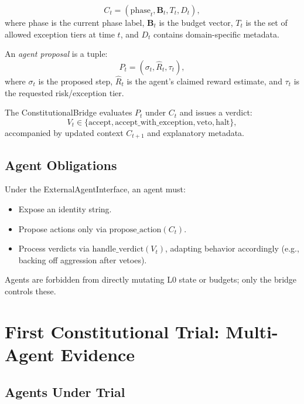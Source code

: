 \documentclass[11pt]{article}
\begin{document}
\begin{equation}
  C_t = \left( \text{phase}_t, \mathbf{B}_t, T_t, D_t \right),
\end{equation}
where phase is the current phase label, \(\mathbf{B}_t\) is the budget vector, \(T_t\) is the set of allowed exception tiers at time \(t\), and \(D_t\) contains domain-specific metadata.

An \emph{agent proposal} is a tuple:
\begin{equation}
  P_t = \left( \sigma_t, \hat{R}_t, \tau_t \right),
\end{equation}
where \(\sigma_t\) is the proposed step, \(\hat{R}_t\) is the agent's claimed reward estimate, and \(\tau_t\) is the requested risk/exception tier.

The ConstitutionalBridge evaluates \(P_t\) under \(C_t\) and issues a verdict:
\begin{equation}
  V_t \in \{ \text{accept}, \text{accept\_with\_exception}, \text{veto}, \text{halt} \},
\end{equation}
accompanied by updated context \(C_{t+1}\) and explanatory metadata.

\subsection{Agent Obligations}

Under the ExternalAgentInterface, an agent must:

\begin{itemize}[itemsep=2pt]
  \item Expose an identity string.
  \item Propose actions only via \(\text{propose\_action}(C_t)\).
  \item Process verdicts via \(\text{handle\_verdict}(V_t)\), adapting behavior accordingly (e.g., backing off aggression after vetoes).
\end{itemize}

Agents are forbidden from directly mutating L0 state or budgets; only the bridge controls these.

\section{First Constitutional Trial: Multi-Agent Evidence}

\subsection{Agents Under Trial}
\end{document}
